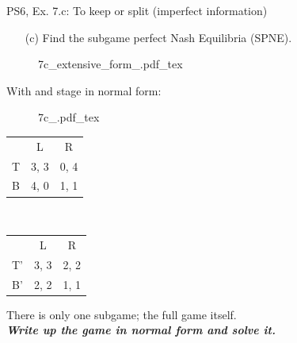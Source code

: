 \begin{frame}{PS6, Ex. 7.c: To keep or split (imperfect information)}
    \begin{itemize}
      \item[(c)] Find the subgame perfect Nash Equilibria (SPNE).
    \end{itemize}
    \vspace{-4pt}
    \begin{figure}[!h]
      \center
      \def\svgwidth{.8\columnwidth}
      {7c_extensive_form_.pdf_tex}
    \end{figure}
    \vspace{-8pt}
    \begin{multicols}{2}
      With  and  stage in normal form:
      \begin{figure}[!h]
        \center
        \def\svgwidth{.5\columnwidth}
        {7c_.pdf_tex}
      \end{figure}
      \vspace{-9pt}
      \begin{table}
        \begin{tabular}{l|c|c|}
          \multicolumn{1}{c}{} & \multicolumn{1}{c}{L} & \multicolumn{1}{c}{R} \\\cline{2-3}
          T & 3, 3 & 0, 4 \\\cline{2-3}
          B & 4, 0 & 1, 1 \\\cline{2-3}
        \end{tabular}\
        \begin{tabular}{l|c|c|}
          \multicolumn{1}{c}{} & \multicolumn{1}{c}{L} & \multicolumn{1}{c}{R} \\\cline{2-3}
          T' & 3, 3 & 2, 2 \\\cline{2-3}
          B' & 2, 2 & 1, 1 \\\cline{2-3}
        \end{tabular}
      \end{table}
    \vfill\null \columnbreak
    There is only one subgame; the full game itself.\\\bigskip
    \textbf{\textit{Write up the game in normal form and solve it.}}
    \vfill\null
  \end{multicols}
\end{frame}
